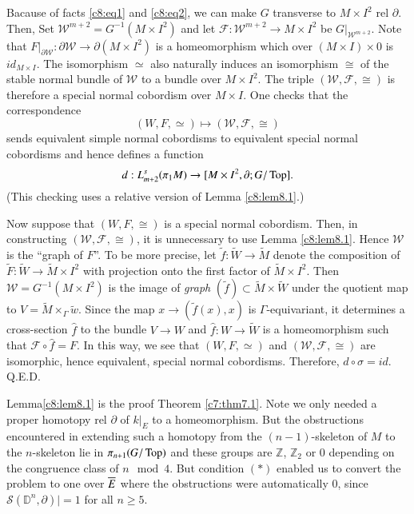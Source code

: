 Bacause of facts \eqref{c8:eq1} and \eqref{c8:eq2}, we can make $G$
transverse to $M \times I^2$ rel $\partial$. Then, Set
$\mathcal{W}^{m+2}= G^{-1} (M \times I^2)$ and let $\mathcal{F}:
\mathcal{W}^{m+2}\to M \times I^2$ be $G|_{\mathcal{W}^{m+2}}$. Note
that $F|_{\partial \mathcal{W}}: \partial \mathcal{W} \to \partial (M
\times I^2)$ is a homeomorphism which over $(M \times I) \times 0$ is
$id_{M \times I}$. The isomorphism $\simeq$ also naturally induces an
isomorphism $\cong$ of the stable normal bundle of $\mathcal{W}$ to a
bundle over $M \times I^2$. The triple $(\mathcal{W}, \mathcal{F},
\cong)$ is therefore a special normal cobordism over $M \times I$. One
checks that the correspondence
$$
(W, F, \simeq) \mapsto (\mathcal{W}, \mathcal{F}, \cong)
$$ 
sends equivalent simple normal cobordisms to equivalent special normal
cobordisms and hence defines a function
$$
d: L^s_{m+2} (\pi_1 M) \to [M \times I^2, \partial; G/\operatorname{Top}].
$$
(This checking uses a relative version of Lemma \ref{c8:lem8.1}.)

Now suppose that $(W, F, \cong)$ is a special normal cobordism. Then,
in constructing $(\mathcal{W}, \mathcal{F}, \cong)$, it is unnecessary
to use Lemma \ref{c8:lem8.1}. Hence $\mathcal{W}$ is the ``graph of
$F$''. To be more precise, let $\tilde{f} : \tilde{W} \to \tilde{M}$
denote the composition of $\tilde{F}: \tilde{W} \to \tilde{M} \times
I^2$ with projection onto the first factor of $\tilde{M} \times
I^2$. Then $\mathcal{W}=G^{-1} (M \times I^2)$ is the image of
\textit{graph} $(\tilde{f}) \subset \tilde{M} \times \tilde{W}$ under
the quotient map to $V= \tilde{M} \times_\Gamma \tilde{w}$. Since the
map $x \to (\tilde{f} (x), x)$ is $\Gamma$-equivariant, it determines
a cross-section $\hat{f}$ to the bundle $V \to W$ and $\hat{f}: W \to
\tilde{W}$ is a homeomorphism such that $\mathcal{F}\circ \hat{f}=
F$. In this way, we see that $(W, F, \simeq)$ and $(\mathcal{W},
\mathcal{F}, \cong)$ are isomorphic, hence equivalent, special normal
cobordisms. Therefore, $d \circ \sigma = id$. \hfill Q.E.D.

\setcounter{remark}{0}
\begin{remark}\label{c8:rem1}
  Lemma\pageoriginale \ref{c8:lem8.1} is the proof Theorem
  \ref{c7:thm7.1}. Note we only needed a proper homotopy rel
  $\partial$ of $k|_{E}$ to a homeomorphism. But the obstructions
  encountered in extending such a homotopy from the $(n-1)$-skeleton
  of $M$ to the $n$-skeleton lie in $\pi_{n+1}(G/\operatorname{Top})$ and
  these groups are $\mathbb{Z}$, $\mathbb{Z}_2$ or 0 depending on the
  congruence class of $n \mod 4$. But condition $(*)$ enabled us to
  convert the problem to one over $\overline{E}$ where the obstructions were
  automatically 0, since $\mathcal{S} (\mathbb{D}^n, \partial)|= 1$
  for all $n \geq 5$. 
\end{remark}


